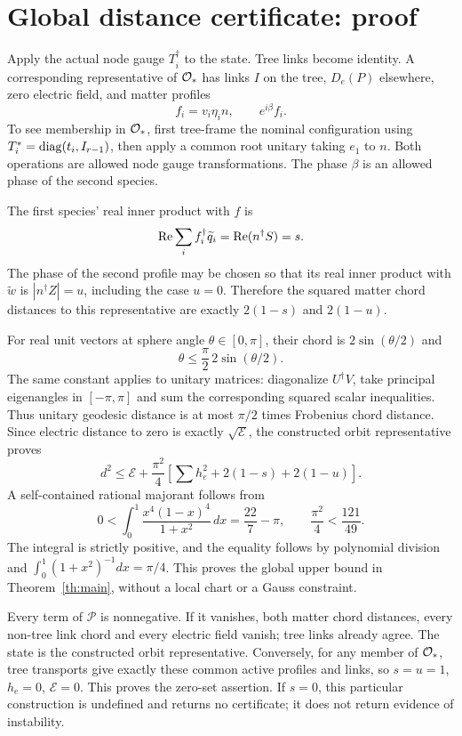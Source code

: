 \documentclass[11pt,a4paper]{article}
\begin{document}
\section{Global distance certificate: proof}
Apply the actual node gauge $T_i^\dagger$ to the state. Tree links become identity. A corresponding representative of $\mathcal O_*$ has links $I$ on the tree, $D_e(P)$ elsewhere, zero electric field, and matter profiles
\[
f_i=v_i\eta_i n,\qquad e^{i\beta}f_i.
\]
To see membership in $\mathcal O_*$, first tree-frame the nominal configuration using
$T_i^*=\operatorname{diag}(t_i,I_{r-1})$, then apply a common root unitary taking $e_1$ to $n$. Both operations are allowed node gauge transformations. The phase $\beta$ is an allowed phase of the second species.

The first species' real inner product with $f$ is
\[
\operatorname{Re}\sum_i f_i^\dagger\widetilde q_i=\operatorname{Re}(n^\dagger S)=s.
\]
The phase of the second profile may be chosen so that its real inner product with $\widetilde w$ is $|n^\dagger Z|=u$, including the case $u=0$. Therefore the squared matter chord distances to this representative are exactly $2(1-s)$ and $2(1-u)$.

For real unit vectors at sphere angle $\theta\in[0,\pi]$, their chord is $2\sin(\theta/2)$ and
\[
\theta\le\frac\pi2\,2\sin(\theta/2).
\]
The same constant applies to unitary matrices: diagonalize $U^\dagger V$, take principal eigenangles in $[-\pi,\pi]$ and sum the corresponding squared scalar inequalities. Thus unitary geodesic distance is at most $\pi/2$ times Frobenius chord distance. Since electric distance to zero is exactly $\sqrt{\mathcal E}$, the constructed orbit representative proves
\[
d^2\le\mathcal E+\frac{\pi^2}{4}
\left[\sum h_e^2+2(1-s)+2(1-u)\right].
\]
A self-contained rational majorant follows from
\[
0<\int_0^1\frac{x^4(1-x)^4}{1+x^2}\,dx=\frac{22}{7}-\pi,
\qquad \frac{\pi^2}{4}<\frac{121}{49}.
\]
The integral is strictly positive, and the equality follows by polynomial division and $\int_0^1(1+x^2)^{-1}dx=\pi/4$. This proves the global upper bound in Theorem~\ref{th:main}, without a local chart or a Gauss constraint.

Every term of $\mathcal P$ is nonnegative. If it vanishes, both matter chord distances, every non-tree link chord and every electric field vanish; tree links already agree. The state is the constructed orbit representative. Conversely, for any member of $\mathcal O_*$, tree transports give exactly these common active profiles and links, so $s=u=1$, $h_e=0$, $\mathcal E=0$. This proves the zero-set assertion. If $s=0$, this particular construction is undefined and returns no certificate; it does not return evidence of instability.
\newpage
\end{document}
